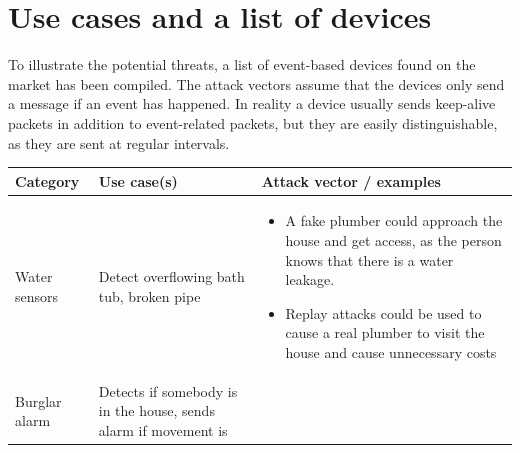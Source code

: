 \section{Use cases and
a list of devices}\label{h.jsdk7si1wtbx}

{To illustrate the potential threats, a list of event-based devices
found on the market \cite{semtech} has been compiled. The attack vectors assume that
the devices only send a message if an event has happened. In reality a device usually sends keep-alive packets in addition to event-related packets, but they are easily distinguishable, as they are sent at regular intervals.

\begin{longtable}[c]{|l|l|l|}
\hline
\begin{minipage}[t]{0.20\columnwidth}\raggedright\strut
\textbf{Category}
\strut\end{minipage} &
\begin{minipage}[t]{0.30\columnwidth}\raggedright\strut
\textbf{Use case(s)}
\strut\end{minipage} &
\begin{minipage}[t]{0.40\columnwidth}\raggedright\strut
\textbf{Attack vector / examples}
\strut\end{minipage}\tabularnewline
\hline
\begin{minipage}[t]{0.20\columnwidth}\raggedright\strut
{Water sensors}
\strut\end{minipage} &
\begin{minipage}[t]{0.30\columnwidth}\raggedright\strut
{Detect overflowing bath tub, broken pipe}
\strut\end{minipage} &
\begin{minipage}[t]{0.40\columnwidth}\raggedright\strut
\begin{itemize}
\tightlist
\item
  {A fake plumber could approach the house and get access, as the person
  knows that there is a water leakage.}
\item
  {Replay attacks could be used to cause a real plumber to visit the
  house and cause unnecessary costs}
\end{itemize}
\strut\end{minipage}\tabularnewline
\hline
\begin{minipage}[t]{0.20\columnwidth}\raggedright\strut
{Burglar alarm}
\strut\end{minipage} &
\begin{minipage}[t]{0.30\columnwidth}\raggedright\strut
{Detects if somebody is in the house, sends alarm if movement is
}
\end{minipage}
\end{longtable}}
